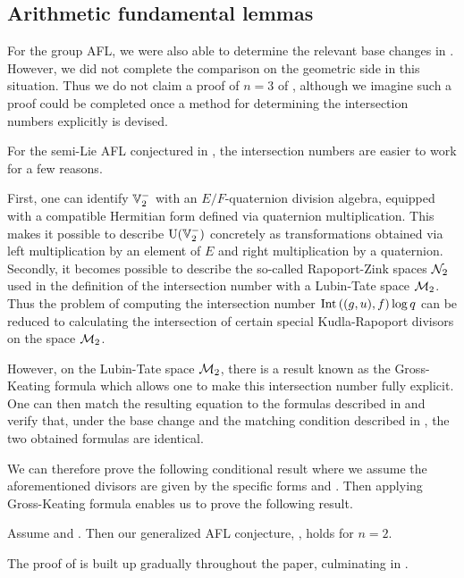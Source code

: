 \subsection{Arithmetic fundamental lemmas}
For the group AFL, we were also able to determine the
relevant base changes in .
However, we did not complete the comparison on the geometric side in this situation.
Thus we do not claim a proof of $n = 3$ of ,
although we imagine such a proof could be completed
once a method for determining the intersection numbers explicitly is devised.

For the semi-Lie AFL conjectured in ,
the intersection numbers are easier to work for a few reasons.
\begin{itemize}
\ii First, one can identify $\mathbb V_2^-$ with an $E/F$-quaternion division algebra,
equipped with a compatible Hermitian form defined via quaternion multiplication.
This makes it possible to describe $\operatorname{U}(\mathbb V_2^-)$ concretely as transformations obtained
via left multiplication by an element of $E$ and right multiplication by a quaternion.
\ii Secondly, it becomes possible to describe the so-called Rapoport-Zink spaces $\mathcal N_2$
used in the definition of the intersection number with a Lubin-Tate space $\mathcal M_2$.
Thus the problem of computing the intersection number
$\operatorname{Int}\left( (g,u), f \right) \log q$
can be reduced to calculating the intersection of certain special
Kudla-Rapoport divisors on the space $\mathcal M_2$.

However, on the Lubin-Tate space $\mathcal M_2$,
there is a result known as the Gross-Keating formula \cite{ref:GK}
which allows one to make this intersection number fully explicit.
One can then match the resulting equation to the formulas described in
and verify that, under the base change 
and the matching condition described in ,
the two obtained formulas are identical.
\end{itemize}

We can therefore prove the following conditional result where we assume
the aforementioned divisors are given by the specific forms
 and .
Then applying Gross-Keating formula enables us to prove the following result.

\begin{theorem}
  \label{thm:semi_lie_n_equals_2}
  Assume  and .
  Then our generalized AFL conjecture, , holds for $n = 2$.
\end{theorem}
The proof of  is built up gradually
throughout the paper, culminating in .

